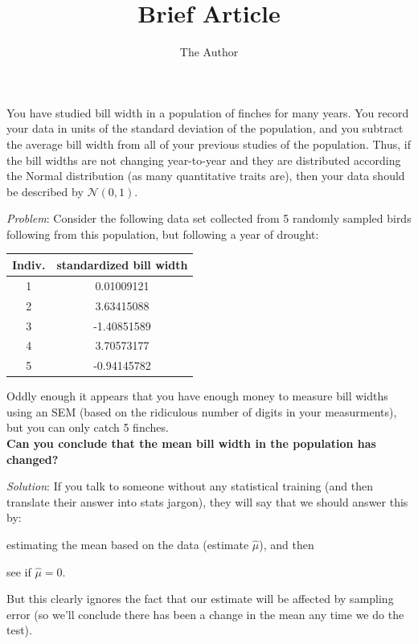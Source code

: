 \documentclass[11pt]{article}
\title{Brief Article}
\author{The Author}
\begin{document}
You have studied bill width in a population of finches for many years. You record your data in units of the standard deviation of the population, and you subtract the average bill width from all of your previous studies of the population.
Thus, if the bill widths are not changing year-to-year and they are distributed according the Normal distribution (as many quantitative traits are), then your data should be described by $\mathcal{N}(0,1)$.

{\it Problem}: 
Consider the following data set collected from 5 randomly sampled birds following from this population, but following a year of drought:
\begin{center}
\begin{tabular}{c|c}
Indiv. & standardized bill width \\
\hline
1 & 0.01009121 \\
2 & 3.63415088 \\
3 &-1.40851589 \\
4 & 3.70573177 \\
5 &-0.94145782
\end{tabular}
\end{center}
Oddly enough it appears that you have enough money to measure bill widths using an SEM (based on the ridiculous number of digits in your measurments), but you can only catch 5 finches.\\
{\bf Can you conclude that the mean bill width in the population has changed?}

{\it Solution}: If you talk to someone without any statistical training (and then translate their answer into stats jargon), they will say that we should answer this by:
\begin{compactenum}
	\item estimating the mean based on the data (estimate $\hat{\mu}$), and then
	\item see if $\hat{\mu} = 0$.
\end{compactenum}
But this clearly ignores the fact that our estimate will be affected by sampling error (so we'll conclude there has been a change in the mean any time we do the test).
\end{document}
